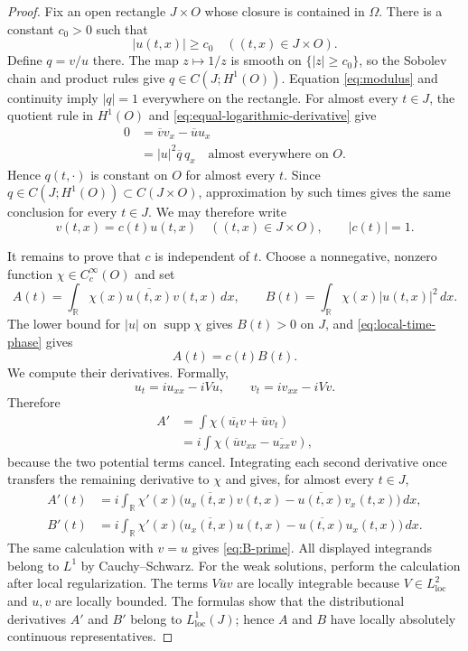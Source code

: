 \documentclass[11pt]{amsart}
\numberwithin{equation}{section}
\theoremstyle{remark}
\newcommand{\R}{\mathbb R}
\newcommand{\supp}{\operatorname{supp}}
\begin{document}
\begin{proof}
Fix an open rectangle $J\times O$ whose closure is contained in $\Omega$.
There is a constant $c_0>0$ such that
\[
 |u(t,x)|\ge c_0
 \quad ((t,x)\in J\times O).
\]
Define $q=v/u$ there.  The map $z\mapsto1/z$ is smooth on
$\{|z|\ge c_0\}$, so the Sobolev chain and product rules give
$q\in C(J;H^1(O))$.  Equation \eqref{eq:modulus} and continuity imply
$|q|=1$ everywhere on the rectangle.  For almost
every $t\in J$, the quotient rule in $H^1(O)$ and
\eqref{eq:equal-logarithmic-derivative} give
\begin{align*}
 0
 &=\overline v v_x-\overline u u_x\\
 &=|u|^2\overline q\,q_x
 \quad\text{almost everywhere on }O.
\end{align*}
Hence $q(t,\cdot)$ is constant on $O$ for almost every $t$.  Since
$q\in C(J;H^1(O))\subset C(J\times O)$, approximation by such times gives the
same conclusion for every $t\in J$.  We may therefore write
\begin{equation}
 v(t,x)=c(t)u(t,x)
 \quad ((t,x)\in J\times O),
 \qquad |c(t)|=1.
 \label{eq:local-time-phase}
\end{equation}

It remains to prove that $c$ is independent of $t$.  Choose a nonnegative,
nonzero function $\chi\in C_c^\infty(O)$ and set
\[
 A(t)=\int_\R\chi(x)\overline{u(t,x)}v(t,x)\,dx,
 \qquad
 B(t)=\int_\R\chi(x)|u(t,x)|^2\,dx.
\]
The lower bound for $|u|$ on $\supp\chi$ gives $B(t)>0$ on $J$, and
\eqref{eq:local-time-phase} gives
\begin{equation}
 A(t)=c(t)B(t).
 \label{eq:A-cB}
\end{equation}
We compute their derivatives.  Formally,
\[
 u_t=iu_{xx}-iVu,
 \qquad
 v_t=iv_{xx}-iVv.
\]
Therefore
\begin{align*}
 A'
 &=\int\chi(\overline{u_t}v+\overline u v_t)\\
 &=i\int\chi(\overline u v_{xx}-\overline{u_{xx}}v),
\end{align*}
because the two potential terms cancel.  Integrating each second derivative
once transfers the remaining derivative to $\chi$ and gives, for almost every
$t\in J$,
\begin{align}
 A'(t)
 &=i\int_\R\chi'(x)
   \bigl(\overline{u_x(t,x)}v(t,x)
         -\overline{u(t,x)}v_x(t,x)\bigr)\,dx,
 \label{eq:A-prime}\\
 B'(t)
 &=i\int_\R\chi'(x)
   \bigl(\overline{u_x(t,x)}u(t,x)
         -\overline{u(t,x)}u_x(t,x)\bigr)\,dx.
 \label{eq:B-prime}
\end{align}
The same calculation with $v=u$ gives \eqref{eq:B-prime}.  All displayed
integrands belong to $L^1$ by Cauchy--Schwarz.  For the weak solutions, perform
the calculation after local regularization.  The terms
$V\overline uv$ are locally integrable because
$V\in L^2_{\mathrm{loc}}$ and $u,v$ are locally bounded.  The formulas show
that the distributional derivatives $A'$ and $B'$ belong to
$L^1_{\mathrm{loc}}(J)$; hence $A$ and $B$ have locally absolutely continuous
representatives.


\end{proof}
\end{document}
